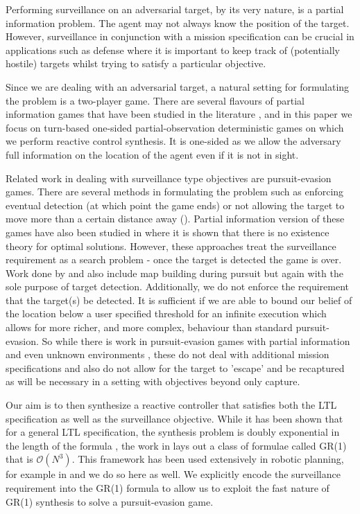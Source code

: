 Performing surveillance on an adversarial target, by its very nature, is a partial information problem. The agent may not always know the position of the target. However, surveillance in conjunction with a mission specification can be crucial in applications such as defense where it is important to keep track of (potentially hostile) targets whilst trying to satisfy a particular objective. 

Since we are dealing with an adversarial target, a natural setting for formulating the problem is a two-player game. There are several flavours of partial information games that have been studied in the literature \cite{Chatterjee2013}, and in this paper we focus on turn-based one-sided partial-observation deterministic games on which we perform reactive control synthesis. It is one-sided as we allow the adversary full information on the location of the agent even if it is not in sight. 

Related work in dealing with surveillance type objectives are pursuit-evasion games. There are several methods in formulating the problem such as enforcing eventual detection (at which point the game ends) \cite{Chen2010} or not allowing the target to move more than a certain distance away (\cite{keylist}). Partial information version of these games have also been studied in \cite{Antoniades2003,keylist} where it is shown that there is no existence theory for optimal solutions. However, these approaches treat the surveillance requirement as a search problem - once the target is detected the game is over. Work done by \cite{Vidal2002} and \cite{Kim2001} also include map building during pursuit but again with the sole purpose of target detection. Additionally, we do not enforce the requirement that the target(s) be detected. It is sufficient if we are able to bound our belief of the location below a user specified threshold for an infinite execution which allows for more richer, and more complex, behaviour than standard pursuit-evasion. So while there is work in pursuit-evasion games with partial information \cite{Chen2010} and even unknown environments \cite{Vidal2002}, these do not deal with additional mission specifications and also do not allow for the target to 'escape' and be recaptured as will be necessary in a setting with objectives beyond only capture.

Our aim is to then synthesize a reactive controller that satisfies both the LTL specification as well as the surveillance objective. While it has been shown that for a general LTL specification, the synthesis problem is doubly exponential in the length of the formula \cite{Pnueli1989}, the work in \cite{Piterman2006} lays out a class of formulae called GR(1) that is $\mathcal{O}(N^3)$. This framework has been used extensively in robotic planning, for example in \cite{wong2012,Kress2007} and we do so here as well. We explicitly encode the surveillance requirement into the GR(1) formula to allow us to exploit the fast nature of GR(1) synthesis to solve a pursuit-evasion game. 


